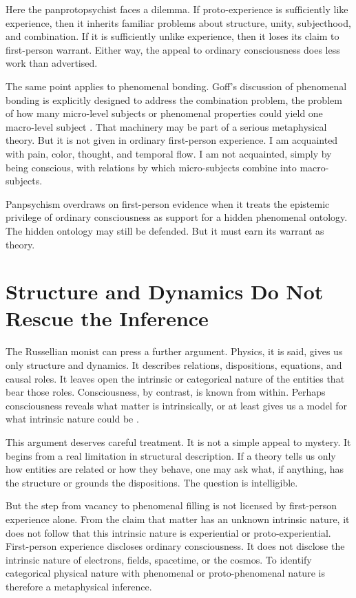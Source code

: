 \documentclass[12pt]{article}
\begin{document}
Here the panprotopsychist faces a dilemma. If proto-experience is sufficiently like experience, then it inherits familiar problems about structure, unity, subjecthood, and combination. If it is sufficiently unlike experience, then it loses its claim to first-person warrant. Either way, the appeal to ordinary consciousness does less work than advertised.

The same point applies to phenomenal bonding. Goff's discussion of phenomenal bonding is explicitly designed to address the combination problem, the problem of how many micro-level subjects or phenomenal properties could yield one macro-level subject \citep{goff2017bonding}. That machinery may be part of a serious metaphysical theory. But it is not given in ordinary first-person experience. I am acquainted with pain, color, thought, and temporal flow. I am not acquainted, simply by being conscious, with relations by which micro-subjects combine into macro-subjects.

Panpsychism overdraws on first-person evidence when it treats the epistemic privilege of ordinary consciousness as support for a hidden phenomenal ontology. The hidden ontology may still be defended. But it must earn its warrant as theory.

\section{Structure and Dynamics Do Not Rescue the Inference}

The Russellian monist can press a further argument. Physics, it is said, gives us only structure and dynamics. It describes relations, dispositions, equations, and causal roles. It leaves open the intrinsic or categorical nature of the entities that bear those roles. Consciousness, by contrast, is known from within. Perhaps consciousness reveals what matter is intrinsically, or at least gives us a model for what intrinsic nature could be \citep{goff2017cfr}.

This argument deserves careful treatment. It is not a simple appeal to mystery. It begins from a real limitation in structural description. If a theory tells us only how entities are related or how they behave, one may ask what, if anything, has the structure or grounds the dispositions. The question is intelligible.

But the step from vacancy to phenomenal filling is not licensed by first-person experience alone. From the claim that matter has an unknown intrinsic nature, it does not follow that this intrinsic nature is experiential or proto-experiential. First-person experience discloses ordinary consciousness. It does not disclose the intrinsic nature of electrons, fields, spacetime, or the cosmos. To identify categorical physical nature with phenomenal or proto-phenomenal nature is therefore a metaphysical inference.
\end{document}
